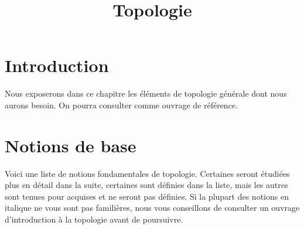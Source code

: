 

%


\title{Topologie}


\maketitle

\label{section-phantom}

\tableofcontents

\section{Introduction}
\label{section-introduction}

\noindent
Nous exposerons dans ce chapitre les éléments de topologie générale dont nous
aurons besoin. On pourra consulter \cite{Engelking} comme ouvrage de référence.

\section{Notions de base}
\label{section-topology-basic}

\noindent
Voici une liste de notions fondamentales de topologie. Certaines seront
étudiées plus en détail dans la suite, certaines sont définies dans la liste,
mais les autres sont tenues pour acquises et ne seront pas définies. Si la
plupart des notions en italique ne vous sont pas familières, nous vous
conseillons de consulter un ouvrage d'introduction à la topologie avant de
poursuivre.

